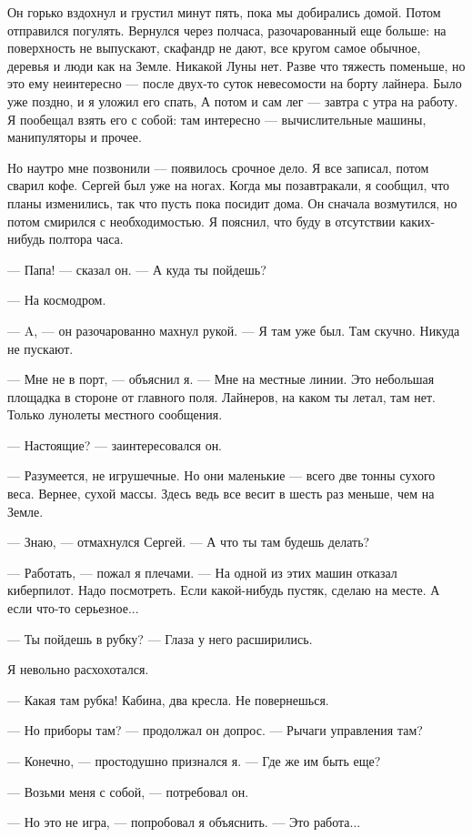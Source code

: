 \documentclass[11pt,a4paper,oneside]{article}
\begin{document}
Он горько вздохнул и грустил минут пять, пока мы добирались домой. Потом отправился погулять. Вернулся через полчаса, разочарованный еще больше: на поверхность не выпускают, скафандр не дают, все кругом самое обычное, деревья и люди как на Земле. Никакой Луны нет. Разве что тяжесть поменьше, но это ему неинтересно — после двух-то суток невесомости на борту лайнера. Было уже поздно, и я уложил его спать, А потом и сам лег — завтра с утра на работу. Я пообещал взять его с собой: там интересно — вычислительные машины, манипуляторы и прочее.

Но наутро мне позвонили — появилось срочное дело. Я все записал, потом сварил кофе. Сергей был уже на ногах. Когда мы позавтракали, я сообщил, что планы изменились, так что пусть пока посидит дома. Он сначала возмутился, но потом смирился с необходимостью. Я пояснил, что буду в отсутствии каких- нибудь полтора часа.

— Папа! — сказал он. — А куда ты пойдешь?

— На космодром.

— A, — он разочарованно махнул рукой. — Я там уже был. Там скучно. Никуда не пускают.

— Мне не в порт, — объяснил я. — Мне на местные линии. Это небольшая площадка в стороне от главного поля. Лайнеров, на каком ты летал, там нет. Только лунолеты местного сообщения.

— Настоящие? — заинтересовался он.

— Разумеется, не игрушечные. Но они маленькие — всего две тонны сухого веса. Вернее, сухой массы. Здесь ведь все весит в шесть раз меньше, чем на Земле.

— Знаю, — отмахнулся Сергей. — А что ты там будешь делать?

— Работать, — пожал я плечами. — На одной из этих машин отказал киберпилот. Надо посмотреть. Если какой-нибудь пустяк, сделаю на месте. А если что-то серьезное...

— Ты пойдешь в рубку? — Глаза у него расширились.

Я невольно расхохотался.

— Какая там рубка! Кабина, два кресла. Не повернешься.

— Но приборы там? — продолжал он допрос. — Рычаги управления там?

— Конечно, — простодушно признался я. — Где же им быть еще?

— Возьми меня с собой, — потребовал он.

— Но это не игра, — попробовал я объяснить. — Это работа...
\end{document}
